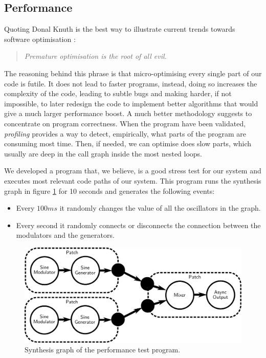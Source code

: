 \subsection{Performance}

Quoting Donal Knuth is the best way to illustrate current trends
towards software optimisation \cite{knuth74structured}:
\begin{quote}
  \it Premature optimisation is the root of all evil.
\end{quote}

The reasoning behind this phrase is that micro-optimising every single
part of our code is futile. It does not lead to faster programs,
instead, doing so increases the complexity of the code, leading to
subtle bugs and making harder, if not impossible, to later redesign
the code to implement better algorithms that would give a much larger
performance boost. A much better methodology suggests to concentrate
on program correctness. When the program have been validated,
\emph{profiling} provides a way to detect, empirically, what parts of
the program are consuming most time. Then, if needed, we can optimise
does slow parts, which usually are deep in the call graph inside the
most nested loops.

We developed a program that, we believe, is a good stress test for our
system and executes most relevant code paths of our system. This
program runs the synthesis graph in figure \ref{fig:perfgraph} for 10
seconds and generates the following events:
\begin{itemize}
\item Every $100 ms$ it randomly changes the value of all the
  oscillators in the graph.
\item Every second it randomly connects or disconnects the connection
  between the modulators and the generators.  
\end{itemize}

\begin{figure}[h]
  \centering
  \includegraphics[width=\textwidth]{pic/graph-perf.pdf}
  \caption{Synthesis graph of the performance test program.}
  \label{fig:perfgraph}
\end{figure}


